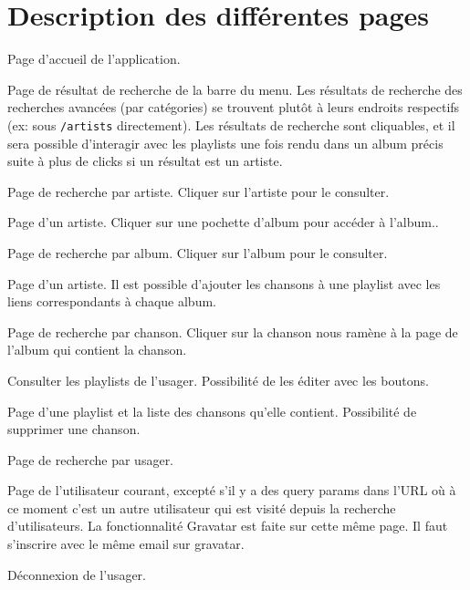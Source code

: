 \documentclass[12pt]{/home/samuel/Documents/GLO/latex/documentClass/GLO_ULAVAL}
\begin{document}
\section*{Description des différentes pages}
\begin{description}[style=nextline]
  \item[\texttt{\slash{}}]\item[] Page d'accueil de l'application.
  \item[\texttt{\slash{}search}] Page de résultat de recherche de la barre du menu. Les résultats de recherche des recherches avancées (par catégories) se trouvent plutôt à leurs endroits respectifs (ex: sous \texttt{\slash{}artists} directement). Les résultats de recherche sont cliquables, et il sera possible d'interagir avec les playlists une fois rendu dans un album précis suite à plus de clicks si un résultat est un artiste.
  \item[\texttt{\slash{}artists}] Page de recherche par artiste. Cliquer sur l'artiste pour le consulter.
  \item[\texttt{\slash{}artists\slash{}:id}] Page d'un artiste. Cliquer sur une pochette d'album pour accéder à l'album..
  \item[\texttt{\slash{}albums}] Page de recherche par album. Cliquer sur l'album pour le consulter.
  \item[\texttt{\slash{}albums\slash{}:id}] Page d'un artiste. Il est possible d'ajouter les chansons à une playlist avec les liens correspondants à chaque album.
  \item[\texttt{\slash{}tracks}] Page de recherche par chanson. Cliquer sur la chanson nous ramène à la page de l'album qui contient la chanson.
  \item[\texttt{\slash{}playlists}] Consulter les playlists de l'usager. Possibilité de les éditer avec les boutons.
  \item[\texttt{\slash{}playlists\slash{}:id}] Page d'une playlist et la liste des chansons qu'elle contient. Possibilité de supprimer une chanson.
  \item[\texttt{\slash{}users}] Page de recherche par usager.
  \item[\texttt{\slash{}account}] Page de l'utilisateur courant, excepté s'il y a des query params dans l'URL où à ce moment c'est un autre utilisateur qui est visité depuis la recherche d'utilisateurs. La fonctionnalité Gravatar est faite sur cette même page. Il faut s'inscrire avec le même email sur gravatar.
  \item[\texttt{\slash{}logout}] Déconnexion de l'usager.
\end{description}
\end{document}
